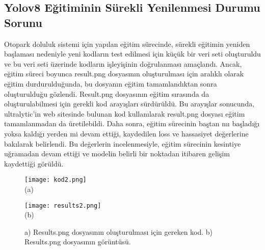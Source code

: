 \documentclass[]{article}
\begin{document}
	\subsection{Yolov8 Eğitiminin Sürekli Yenilenmesi Durumu Sorunu}
	Otopark doluluk sistemi için yapılan eğitim sürecinde, sürekli eğitimin yeniden başlaması nedeniyle yeni kodların test edilmesi için küçük bir veri seti oluşturuldu ve bu veri seti üzerinde kodların işleyişinin doğrulanması amaçlandı. Ancak, eğitim süreci boyunca result.png dosyasının oluşturulması için aralıklı olarak eğitim durdurulduğunda, bu dosyanın eğitim tamamlandıktan sonra oluşturulduğu gözlendi. Result.png dosyasının eğitim sırasında da oluşturulabilmesi için gerekli kod arayışları sürdürüldü. Bu arayışlar sonucunda, ultralytic'in web sitesinde bulunan kod kullanılarak result.png dosyası eğitim tamamlanmadan da üretilebildi\cite{result}. Daha sonra, eğitim sürecinin baştan mı başladığı yoksa kaldığı yerden mi devam ettiği, kaydedilen loss ve hassasiyet değerlerine bakılarak belirlendi. Bu değerlerin incelenmesiyle, eğitim sürecinin kesintiye uğramadan devam ettiği ve modelin belirli bir noktadan itibaren gelişim kaydettiği görüldü.
	
	\begin{figure}[htbp]
		\centering
		\begin{minipage}{0.43\textwidth}
			\centering
			\texttt{[image: kod2.png]}
			\\
			(a)
		\end{minipage}
		\hfill
		\begin{minipage}{0.43\textwidth}
			\centering
			\texttt{[image: results2.png]}
			\\
			(b)
		\end{minipage}
		\newline
		\caption{
			{a) Results.png dosyasının oluşturulması için gereken kod.}
			{b) Results.png dosyasının görüntüsü.}}
	\end{figure}
	\newpage
\end{document}
